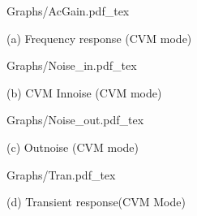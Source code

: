 \documentclass{article}
\begin{document}
\begin{figure}[!hb]
    \begin{minipage}[b]{1\linewidth}
        \centering
        \def\svgwidth{8cm}
        \fontsize{6}{8}\selectfont
         {Graphs/AcGain.pdf_tex}
        \fontsize{8}{10}\selectfont
        \centerline{(a) Frequency response (CVM mode)}\medskip
    \end{minipage}

    \begin{minipage}[!htb]{0.5\linewidth}
        \centering
        \def\svgwidth{4cm}
        \fontsize{6}{8}\selectfont
         {Graphs/Noise_in.pdf_tex}
        \fontsize{8}{10}\selectfont
        \centerline{(b) CVM Innoise (CVM mode) }\medskip
    \end{minipage}
    \hfill
    \begin{minipage}[!htb]{0.5\linewidth}
        \centering
        \def\svgwidth{5.1cm}
        \fontsize{6}{8}\selectfont
         {Graphs/Noise_out.pdf_tex}
        \fontsize{8}{10}\selectfont
        \centerline{(c) Outnoise (CVM mode) }\medskip
    \end{minipage}

    \begin{minipage}[!hb]{1\linewidth}
        \centering
        \def\svgwidth{9cm}
        \fontsize{4}{6}\selectfont
         {Graphs/Tran.pdf_tex}
        \fontsize{8}{10}\selectfont
        \centerline{(d) Transient response(CVM Mode) }\medskip
    \end{minipage}
    \caption{}
    \label{fig:res}
\end{figure}
\end{document}
